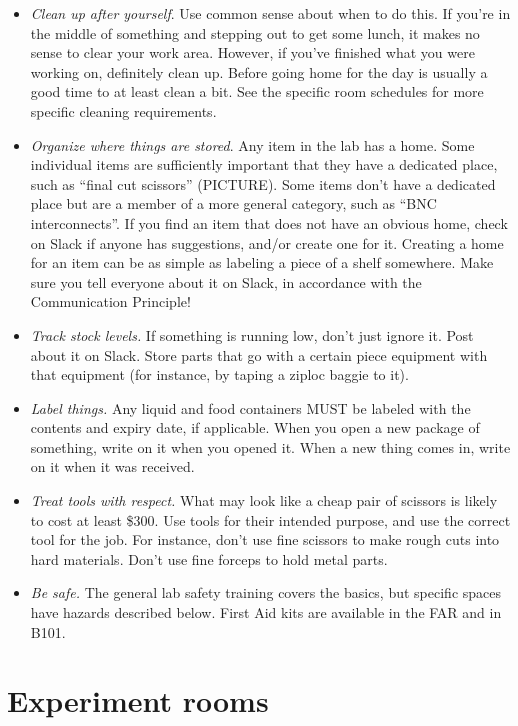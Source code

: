 \documentclass{tufte-book}
\begin{document}
\begin{itemize}
\item{{\it Clean up after yourself}. Use common sense about when to do
  this. If you're in the middle of something and stepping out to get
  some lunch, it makes no sense to clear your work area. However, if
  you've finished what you were working on, definitely clean
  up. Before going home for the day is usually a good time to at least
  clean a bit. See the specific room schedules for more specific
  cleaning requirements.}
\item{{\it Organize where things are stored}. Any item in the lab has a
  home. Some individual items are sufficiently important that they
  have a dedicated place, such as ``final cut scissors''
  (PICTURE). Some items don't have a dedicated place but are a member
  of a more general category, such as ``BNC interconnects''. If you
  find an item that does not have an obvious home, check on Slack if
  anyone has suggestions, and/or create one for it. Creating a home
  for an item can be as simple as labeling a piece of a shelf
  somewhere. Make sure you tell everyone about it on Slack, in
  accordance with the Communication Principle!}
\item{{\it Track stock levels.} If something is running low, don't
  just ignore it. Post about it on Slack. Store parts that go with a
  certain piece equipment with that equipment (for instance, by taping
a ziploc baggie to it).}
\item{{\it Label things.} Any liquid and food containers MUST be labeled with
  the contents and expiry date, if applicable. When you open a new
  package of something, write on it when you opened it. When a new
  thing comes in, write on it when it was received.}
\item{{\it Treat tools with respect.} What may look like a cheap pair of
  scissors is likely to cost at least \$300. Use tools for their
  intended purpose, and use the correct tool for the job. For
  instance, don't use fine scissors to make rough cuts into hard
  materials. Don't use fine forceps to hold metal parts. }
\item{{\it Be safe.} The general lab safety training covers the
  basics, but specific spaces have hazards described below. First Aid
  kits are available in the FAR and in B101.}
\end{itemize} 


\section{Experiment rooms}
\end{document}
